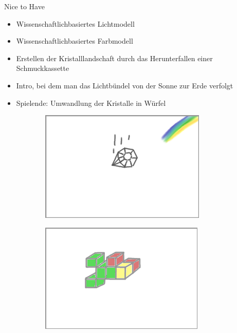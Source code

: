 \slideonetoone
{Nice to Have}
{
	\begin{itemize}
		\item Wissenschaftlichbasiertes Lichtmodell
		\item Wissenschaftlichbasiertes Farbmodell
		\item Erstellen der Kristalllandschaft durch das Herunterfallen einer Schmuckkassette
		\item Intro, bei dem man das Lichtbündel von der Sonne zur Erde verfolgt
		\item Spielende: Umwandlung der Kristalle in Würfel
	\end{itemize}
}
{
	\begin{figure}
		\centering
		\begin{subfigure}{\textwidth}
			\centering
			\includegraphics[width=\textwidth, height=0.35\textheight, keepaspectratio]{images/Skizzen/intro}
		\end{subfigure}
		\begin{subfigure}{\textwidth}
			\centering
			\includegraphics[width=\textwidth, height=0.35\textheight, keepaspectratio]{images/Skizzen/ende}
		\end{subfigure}
	\end{figure}
}

